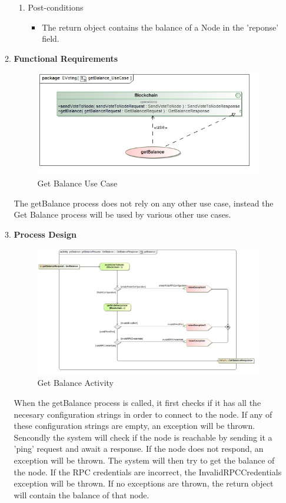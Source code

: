 \begin{enumerate}
\begin{enumerate}
\begin{enumerate}
				\item Post-conditions
				\begin{itemize}
					\item  The return object contains the balance of a Node in the 'reponse' field.
				\end{itemize}
			\end{enumerate}
			
			\newpage
			
			\item \textbf{Functional Requirements}
			\begin{figure}[H]
				\centering
				\includegraphics[width=0.75\linewidth]{../Images/Blockchain/UseCase/getBalance_UseCase.jpg}
				\caption{Get Balance Use Case}
			\end{figure}
			
			The getBalance process does not rely on any other use case, instead the Get Balance process will be used by various other use cases.
			\newline
			
			\item \textbf{Process Design}
			\begin{figure}[H]
				\centering
				\includegraphics[width=0.75\linewidth]{../Images/Blockchain/Activity/getBalance.jpg}
				\caption{Get Balance Activity}
			\end{figure}
			
				When the getBalance process is called, it first checks if it has all the necesary configuration strings in order to connect to the node. If any of these configuration strings are empty, an exception will be thrown. Sencondly the system will check if the node is reachable by sending it a 'ping' request and await a response. If the node does not respond, an exception will be thrown.
				The system will then try to get the balance of the node. If the RPC credentials are incorrect, the InvalidRPCCredentials exception will be thrown. If no exceptions are thrown, the return object will contain the balance of that node.
			\newline
		\end{enumerate}
\end{enumerate}